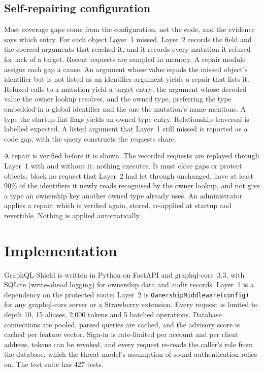 \documentclass[conference]{IEEEtran}
\newcommand{\code}[1]{\texttt{\small #1}}
\begin{document}
\subsection{Self-repairing configuration}\label{sec:repair-design}
Most coverage gaps come from the configuration, not the code, and the evidence says which entry. For each object Layer~1 missed, Layer~2 records the field and the coerced arguments that reached it, and it records every mutation it refused for lack of a target. Recent requests are sampled in memory. A repair module assigns each gap a cause. An argument whose value equals the missed object's identifier but is not listed as an identifier argument yields a repair that lists it. Refused calls to a mutation yield a target entry: the argument whose decoded value the owner lookup resolves, and the owned type, preferring the type embedded in a global identifier and the one the mutation's name mentions. A type the startup lint flags yields an owned-type entry. Relationship traversal is labelled expected. A listed argument that Layer~1 still missed is reported as a code gap, with the query constructs the requests share.

A repair is verified before it is shown. The recorded requests are replayed through Layer~1 with and without it; nothing executes. It must close gaps or protect objects, block no request that Layer~2 had let through unchanged, have at least 90\% of the identifiers it newly reads recognised by the owner lookup, and not give a type an ownership key another owned type already uses. An administrator applies a repair, which is verified again, stored, re-applied at startup and revertible. Nothing is applied automatically.

\section{Implementation}

GraphQL-Shield is written in Python on FastAPI and graphql-core~3.3, with SQLite (write-ahead logging) for ownership data and audit records. Layer~1 is a dependency on the protected route; Layer~2 is \code{OwnershipMiddleware(config)} for any graphql-core server or a Strawberry extension. Every request is limited to depth 10, 15 aliases, 2,000 tokens and 5 batched operations. Database connections are pooled, parsed queries are cached, and the advisory score is cached per feature vector. Sign-in is rate-limited per account and per client address, tokens can be revoked, and every request re-reads the caller's role from the database, which the threat model's assumption of sound authentication relies on. The test suite has 427 tests.
\end{document}
